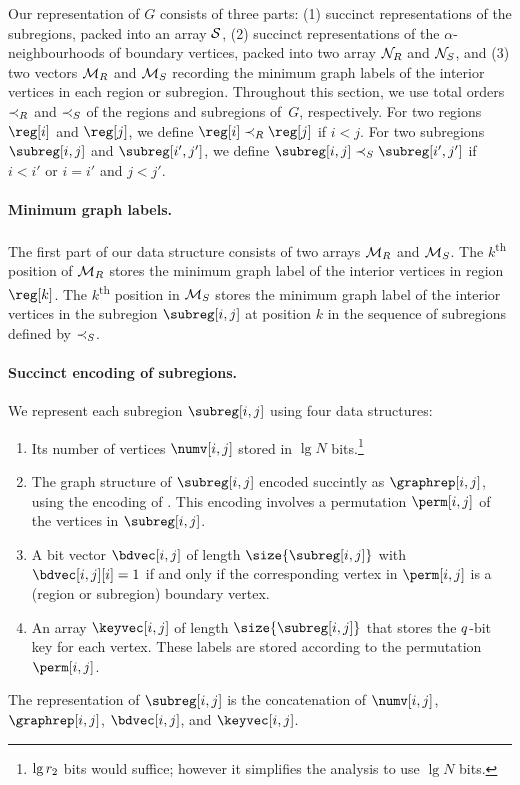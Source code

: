 {Our representation of $G$ consists of three parts: (1) succinct
representations of the subregions, packed into an array $\mathcal{S}$, (2)
succinct representations of the $\alpha$-neighbourhoods of boundary
vertices, packed into two array $\mathcal{N}_R$ and $\mathcal{N}_S$, and (3) two
vectors $\mathcal{M}_R$ and $\mathcal{M}_S$ recording the minimum graph labels of
the interior vertices in each region or subregion.
Throughout this section, we use total orders $\prec_R$ and $\prec_S$ of the
regions and subregions of~$G$, respectively.
For two regions $\reg[i]$ and $\reg[j]$, we define $\reg[i] \reglt \reg[j]$ if
$i < j$.
For two subregions $\subreg[i,j]$ and $\subreg[i',j']$, we define
$\subreg[i,j] \subreglt \subreg[i',j']$ if $i < i'$ or $i = i'$ and $j < j'$.

\paragraph{Minimum graph labels.}

The first part of our data structure consists of two arrays $\mathcal{M}_R$ and
$\mathcal{M}_S$.
The $k$\textsuperscript{th} position of $\mathcal{M}_R$ stores the minimum graph
label of the interior vertices in region $\reg[k]$.
The $k$\textsuperscript{th} position in $\mathcal{M}_S$ stores the minimum graph label of the
interior vertices in the subregion $\subreg[i,j]$ at position $k$ in the
sequence of subregions defined by $\prec_S$.

\paragraph{Succinct encoding of subregions.}

We represent each subregion $\subreg[i,j]$ using four data structures:
\begin{enumerate}
\item Its number of vertices $\numv[i,j]$ stored in $\lg N$
  bits.\footnote{$\lg r_2$ bits would suffice; however it simplifies the
    analysis to use $\lg N$ bits.}
\item The graph structure of $\subreg[i,j]$ encoded succintly as
	$\graphrep[i,j]$, using the encoding of 
	\cite{DBLP:journals/siamcomp/ChiangLL05}.
  This encoding involves a permutation $\perm[i,j]$ of
  the vertices in $\subreg[i,j]$.
\item A bit vector $\bdvec[i,j]$ of length $\size{\subreg[i,j]}$ with
  $\bdvec[i,j][i] = 1$ if and only if the corresponding vertex in $\perm[i,j]$
  is a  (region or subregion) boundary vertex.
\item An array $\keyvec[i,j]$ of length $\size{\subreg[i,j]}$ that stores the
  $q$-bit key for each vertex.
  These labels are stored according to the permutation $\perm[i,j]$.
\end{enumerate}
The representation of $\subreg[i,j]$ is the concatenation of $\numv[i,j]$,
$\graphrep[i,j]$, $\bdvec[i,j]$, and $\keyvec[i,j]$.

}
